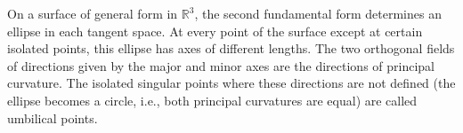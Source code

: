 On a surface of general form in $\mathbb{R}^3$, the second fundamental form determines an ellipse in each tangent space. At every point of the surface except at certain isolated points, this ellipse has axes of different lengths. The two orthogonal fields of directions given by the major and minor axes are the directions of principal curvature. The isolated singular points where these directions are not defined (the ellipse becomes a circle, i.e., both principal curvatures are equal) are called umbilical points.
